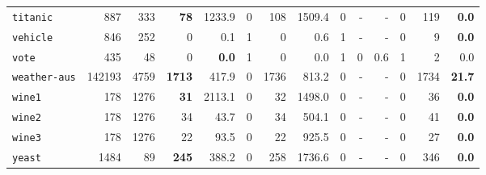 \begin{tabular}{lccrrrrrrrrrrr}
\texttt{titanic} & \multicolumn{1}{r}{887} & \multicolumn{1}{r}{333}  & \textbf{78} & 1233.9 & 0 & 108 & 1509.4 & 0 & - & - & 0 & 119 & \textbf{0.0}\\
\texttt{vehicle} & \multicolumn{1}{r}{846} & \multicolumn{1}{r}{252}  & 0 & 0.1 & 1 & 0 & 0.6 & 1 & - & - & 0 & 9 & \textbf{0.0}\\
\texttt{vote} & \multicolumn{1}{r}{435} & \multicolumn{1}{r}{48}  & 0 & \textbf{0.0} & 1 & 0 & 0.0 & 1 & 0 & 0.6 & 1 & 2 & 0.0\\
\texttt{weather-aus} & \multicolumn{1}{r}{142193} & \multicolumn{1}{r}{4759}  & \textbf{1713} & 417.9 & 0 & 1736 & 813.2 & 0 & - & - & 0 & 1734 & \textbf{21.7}\\
\texttt{wine1} & \multicolumn{1}{r}{178} & \multicolumn{1}{r}{1276}  & \textbf{31} & 2113.1 & 0 & 32 & 1498.0 & 0 & - & - & 0 & 36 & \textbf{0.0}\\
\texttt{wine2} & \multicolumn{1}{r}{178} & \multicolumn{1}{r}{1276}  & 34 & 43.7 & 0 & 34 & 504.1 & 0 & - & - & 0 & 41 & \textbf{0.0}\\
\texttt{wine3} & \multicolumn{1}{r}{178} & \multicolumn{1}{r}{1276}  & 22 & 93.5 & 0 & 22 & 925.5 & 0 & - & - & 0 & 27 & \textbf{0.0}\\
\texttt{yeast} & \multicolumn{1}{r}{1484} & \multicolumn{1}{r}{89}  & \textbf{245} & 388.2 & 0 & 258 & 1736.6 & 0 & - & - & 0 & 346 & \textbf{0.0}\\
\bottomrule
\end{tabular}
